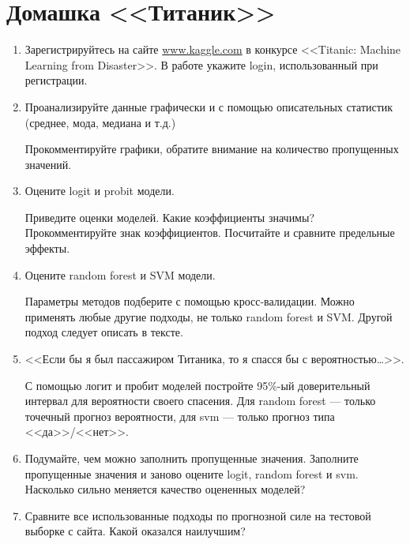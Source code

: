 \documentclass[a4paper]{article}
\begin{document}
\pagestyle{empty}
\section*{Домашка <<Титаник>>}



\begin{enumerate}

\item Зарегистрируйтесь на сайте \url{www.kaggle.com}  в конкурсе <<Titanic: Machine Learning from Disaster>>. В работе укажите login, использованный при регистрации.

\item Проанализируйте данные графически и с помощью описательных статистик (среднее, мода, медиана и т.д.)

Прокомментируйте графики, обратите внимание на количество пропущенных значений.

\item Оцените logit и probit модели.

Приведите оценки моделей. Какие коэффициенты значимы? Прокомментируйте знак коэффициентов. Посчитайте и сравните предельные эффекты.

\item Оцените random forest и SVM модели. 

Параметры методов подберите с помощью кросс-валидации. Можно применять любые другие подходы, не только random forest и SVM. Другой подход следует описать в тексте.


\item <<Если бы я был пассажиром Титаника, то я спасся бы с вероятностью\ldots>>. 

С помощью логит и пробит моделей постройте 95\%-ый доверительный интервал для вероятности своего спасения. Для random forest --- только точечный прогноз вероятности, для svm --- только прогноз типа <<да>>/<<нет>>.


\item Подумайте, чем можно заполнить пропущенные значения. Заполните пропущенные значения и заново оцените logit, random forest и svm. Насколько сильно меняется качество оцененных моделей?


\item Сравните все использованные подходы по прогнозной силе на тестовой выборке с сайта. Какой оказался наилучшим?


\end{enumerate}
\end{document}
